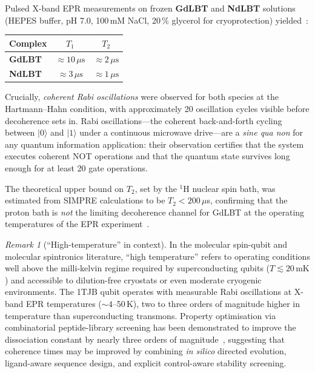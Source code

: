 \documentclass[11pt,oneside]{amsbook}
\numberwithin{equation}{section}
\theoremstyle{plain}
\theoremstyle{definition}
\theoremstyle{remark}
\newtheorem{remark}[theorem]{Remark}
\begin{document}
Pulsed X-band EPR measurements on frozen \textbf{GdLBT} and \textbf{NdLBT}
solutions (HEPES buffer, pH 7.0, 100\,mM NaCl, 20\,\% glycerol for
cryoprotection) yielded~\cite{RosalenyEtAl2017}:
\begin{center}
\begin{tabular}{lcc}
\toprule
Complex & $T_1$ & $T_2$ \\
\midrule
\textbf{GdLBT} & $\approx 10\,\mu\text{s}$ & $\approx 2\,\mu\text{s}$ \\
\textbf{NdLBT} & $\approx 3\,\mu\text{s}$  & $\approx 1\,\mu\text{s}$ \\
\bottomrule
\end{tabular}
\end{center}
Crucially, \emph{coherent Rabi oscillations} were observed for both species at
the Hartmann--Hahn condition, with approximately 20 oscillation cycles visible
before decoherence sets in.  Rabi oscillations---the coherent back-and-forth
cycling between $|0\rangle$ and $|1\rangle$ under a continuous microwave
drive---are a \emph{sine qua non} for any quantum information application: their
observation certifies that the system executes coherent NOT operations and that
the quantum state survives long enough for at least 20 gate operations.

The theoretical upper bound on $T_2$, set by the ${}^1$H nuclear spin bath, was
estimated from SIMPRE calculations to be $T_2 < 200\,\mu$s, confirming that the
proton bath is \emph{not} the limiting decoherence channel for GdLBT at
the operating temperatures of the EPR experiment~\cite{RosalenyEtAl2017}.

\begin{remark}[``High-temperature'' in context]
In the molecular spin-qubit and molecular spintronics literature, ``high
temperature'' refers to operating conditions well above the milli-kelvin regime
required by superconducting qubits ($T \lesssim 20\,\text{mK}$) and accessible
to dilution-free cryostats or even moderate cryogenic environments.  The 1TJB
qubit operates with measurable Rabi oscillations at X-band EPR temperatures
($\sim 4$--50\,K), two to three orders of magnitude higher in temperature than
superconducting transmons.  Property optimisation via combinatorial peptide-library
screening has been demonstrated to improve the dissociation constant by nearly
three orders of magnitude~\cite{RosalenyEtAl2017}, suggesting that coherence
times may be improved by combining \emph{in silico} directed evolution,
ligand-aware sequence design, and explicit control-aware stability screening.
\end{remark}
\end{document}

